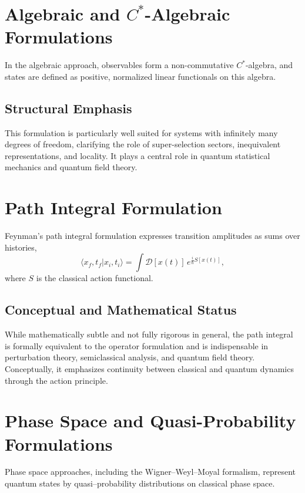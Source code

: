 \section{Algebraic and $C^*$-Algebraic Formulations}
In the algebraic approach, observables form a non-commutative $C^*$-algebra,
and states are defined as positive, normalized linear functionals on this algebra.

\subsection{Structural Emphasis}

This formulation is particularly well suited for systems with infinitely 
many degrees of freedom, clarifying the role of super-selection sectors, 
inequivalent representations, and locality. It plays a central role in quantum
statistical mechanics and quantum field theory.

\section{Path Integral Formulation}

Feynman’s path integral formulation expresses transition amplitudes as sums over histories,
\begin{equation}
 \langle x_f,t_f | x_i,t_i \rangle
 = \int \mathcal{D}[x(t)]\, e^{\frac{i}{\hbar} S[x(t)]},
\end{equation}
where $S$ is the classical action functional.

\subsection{Conceptual and Mathematical Status}

While mathematically subtle and not fully rigorous in general, the path integral 
is formally equivalent to the operator formulation and is indispensable in 
perturbation theory, semiclassical analysis, and quantum field theory. 
Conceptually, it emphasizes continuity between classical and quantum dynamics 
through the action principle.

\section{Phase Space and Quasi-Probability Formulations}

Phase space approaches, including the Wigner--Weyl--Moyal formalism, 
represent quantum states by quasi--probability distributions on classical phase space.

